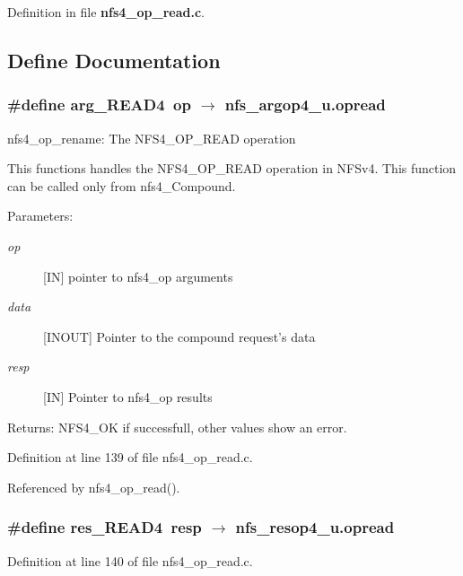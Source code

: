 Definition in file {\bf nfs4\_\-op\_\-read.c}.

\subsection{Define Documentation}
\subsubsection{\setlength{\rightskip}{0pt plus 5cm}\#define arg\_\-READ4\ op $\rightarrow$ nfs\_\-argop4\_\-u.opread}\label{nfs4__op__read_8c_a0}


nfs4\_\-op\_\-rename: The NFS4\_\-OP\_\-READ operation

This functions handles the NFS4\_\-OP\_\-READ operation in NFSv4. This function can be called only from nfs4\_\-Compound.

\begin{Desc}
\item[Parameters:]
\begin{description}
\item[{\em op}][IN] pointer to nfs4\_\-op arguments \item[{\em data}][INOUT] Pointer to the compound request's data \item[{\em resp}][IN] Pointer to nfs4\_\-op results\end{description}
\end{Desc}
\begin{Desc}
\item[Returns:]NFS4\_\-OK if successfull, other values show an error. \end{Desc}


Definition at line 139 of file nfs4\_\-op\_\-read.c.

Referenced by nfs4\_\-op\_\-read().
\subsubsection{\setlength{\rightskip}{0pt plus 5cm}\#define res\_\-READ4\ resp $\rightarrow$ nfs\_\-resop4\_\-u.opread}\label{nfs4__op__read_8c_a1}




Definition at line 140 of file nfs4\_\-op\_\-read.c.

